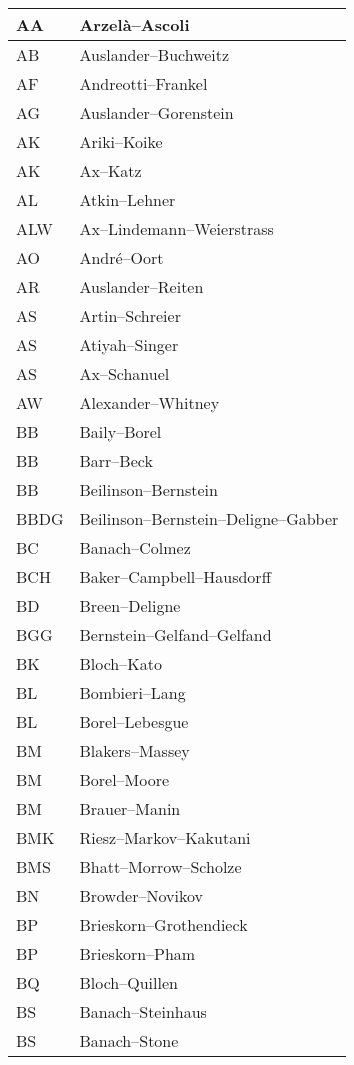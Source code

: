 \documentclass{amsart}
\numberwithin{equation}{section}
\theoremstyle{plain}
\numberwithin{equation}{section}
\theoremstyle{remark}
\begin{document}
\begin{longtable}{l|l}
\hline
AA & Arzelà--Ascoli\\ \hline
AB & Auslander--Buchweitz\\ \hline
AF & Andreotti--Frankel\\ \hline
AG & Auslander--Gorenstein\\ \hline
AK & Ariki--Koike\\ \hline
AK & Ax--Katz\\ \hline
AL & Atkin--Lehner\\ \hline
ALW &  Ax--Lindemann--Weierstrass\\ \hline
AO & André--Oort\\ \hline
AR & Auslander--Reiten  \\ \hline
AS & Artin--Schreier\\ \hline
AS & Atiyah--Singer\\ \hline
AS & Ax--Schanuel\\ \hline
AW & Alexander--Whitney\\ \hline
BB & Baily--Borel\\ \hline
BB & Barr--Beck\\ \hline
BB & Beilinson--Bernstein\\ \hline
BBDG & Beilinson--Bernstein--Deligne--Gabber\\ \hline
BC & Banach--Colmez\\ \hline
BCH & Baker--Campbell--Hausdorff\\ \hline
BD & Breen--Deligne\\ \hline
BGG & Bernstein--Gelfand--Gelfand\\ \hline
BK & Bloch--Kato\\ \hline
BL & Bombieri--Lang\\ \hline
BL & Borel--Lebesgue\\ \hline
BM  & Blakers--Massey\\ \hline
BM & Borel--Moore\\ \hline
BM & Brauer--Manin\\ \hline
BMK & Riesz--Markov--Kakutani\\ \hline
BMS & Bhatt--Morrow--Scholze\\ \hline
BN & Browder--Novikov\\ \hline
BP & Brieskorn--Grothendieck\\ \hline
BP & Brieskorn--Pham\\ \hline
BQ & Bloch--Quillen\\ \hline
BS & Banach--Steinhaus\\ \hline
BS & Banach--Stone\\ \hline

\end{longtable}
\end{document}
